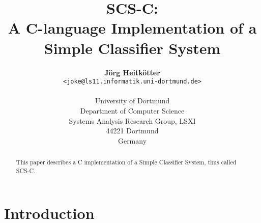 

\renewcommand{\textfraction}{0.05}
\renewcommand{\topfraction}{0.95}
\baselineskip
\parindent=0pt
\fancyovalframe


\title{	SCS-C:							\\
	A C-language Implementation of a			\\ 
	Simple Classifier System}

\author{{\bf J\"org Heitk\"otter}				\\
	\verb+<joke@ls11.informatik.uni-dortmund.de>+		\\
	\							\\
	University of Dortmund					\\
	Department of Computer Science				\\
	Systems Analysis Research Group, LSXI			\\
	44221 Dortmund						\\
	Germany							\\
}


\maketitle
\thispagestyle{empty}


\begin{abstract}
This paper describes a C implementation of a Simple Classifier System,
thus called SCS-C.
\end{abstract}

\newpage
\section{Introduction}

